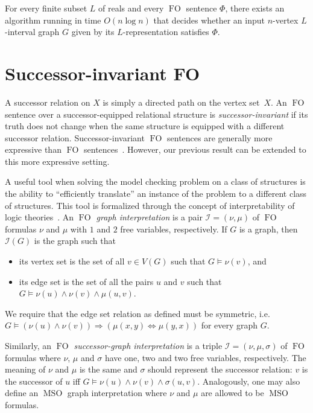 \documentclass{CSML}
\newcommand{\FO}{\ensuremath{\operatorname{FO}}\xspace}
\newcommand{\MSO}{\ensuremath{\operatorname{MSO}}\xspace}
\newcommand{\cI}{\mathcal{I}}
\theoremstyle{plain}\newtheorem{claim}[thm]{Claim}
\begin{document}
\begin{thm}
\label{thm-L-interval}
For every finite subset $L$ of reals and every \FO sentence $\Phi$, there exists an algorithm
running in time $O(n\log n)$ that decides whether an input $n$-vertex $L$-interval graph $G$
given by its $L$-representation satisfies $\Phi$.
\end{thm}


\section{Successor-invariant FO}
\label{sec:succinvar}

A successor relation on $X$ is simply a directed path on the vertex set~$X$.
An \FO sentence over a successor-equipped relational structure is 
{\em successor-invariant} if its truth does not change when the same
structure is equipped with a different successor relation.
Successor-invariant \FO sentences are generally more expressive than \FO sentences~\cite{Ros07}.
However, our previous result can be extended to this more expressive setting.

A useful tool when solving the model checking problem on a class of
structures is the ability to ``efficiently translate'' an instance of the problem to a different class of structures.
This tool is formalized through the concept of interpretability of logic theories~\cite{Rab64}.
An {\em\FO graph interpretation} is a pair $\cI=(\nu,\mu)$ of {\em \FO} formulas $\nu$ and $\mu$ with $1$ and $2$ free variables, respectively.
If $G$ is a graph, then $\cI(G)$ is the graph such that
\begin{itemize}
\item its vertex set is the set of all $v\in V(G)$ such that $G\models \nu(v)$, and
\item its edge set is the set of all the pairs $u$ and $v$ such that $G\models \nu(u)\wedge\nu(v)\wedge\mu(u,v)$.
\end{itemize}
We require that the edge set relation as defined must be symmetric,
i.e.~$G\models (\nu(u)\land\nu(v))\Rightarrow(\mu(x,y)\Leftrightarrow\mu(y,x))$ for every graph $G$.

Similarly, an {\em \FO successor-graph interpretation} is a triple $\cI=(\nu,\mu,\sigma)$ of {\em \FO} formulas
where $\nu$, $\mu$ and $\sigma$ have one, two and two free variables, respectively.
The meaning of $\nu$ and $\mu$ is the same and $\sigma$  should represent the successor relation:
$v$ is the successor of $u$ iff $G\models\nu(u)\wedge\nu(v)\wedge\sigma(u,v)$.
Analogously, one may also define an \MSO graph interpretation
where $\nu$ and $\mu$ are allowed to be \MSO formulas.
\end{document}
